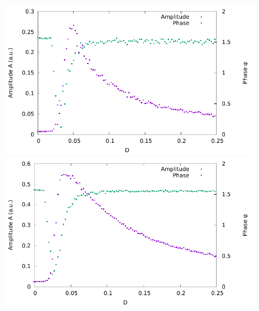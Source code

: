\documentclass[10pt,fleqn,%
reqno,a4paper]{article}
\begin{document}
\begin{figure}[htpb]
	
	\begin{minipage}[b]{0.5\linewidth}
		\includegraphics[width=\linewidth]{gnuplot_pictures/final_pictures/ampl_0p03_phase.pdf}
	\end{minipage} 
	\begin{minipage}[b]{0.5\linewidth}
		\includegraphics[width=\linewidth]{gnuplot_pictures/final_pictures/ampl_0p1_phase.pdf} 		
	\end{minipage} 


\end{figure}
\end{document}
